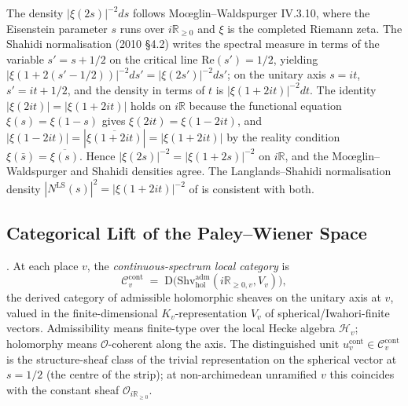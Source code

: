 \begin{remark}
\label{v4-arith:w6-d:rem:plancherel-density}
The density \(|\xi(2s)|^{-2}ds\) follows Mo{\oe}glin--Waldspurger IV.3.10,
where the Eisenstein parameter \(s\) runs over \(i\mathbb{R}_{\geq 0}\)
and \(\xi\) is the completed Riemann zeta. The Shahidi normalisation
(2010 \S 4.2) writes the spectral measure in terms of the variable
\(s' = s + 1/2\) on the critical line \(\mathrm{Re}(s')=1/2\),
yielding \(|\xi(1+2(s'-1/2))|^{-2}ds' = |\xi(2s')|^{-2}ds'\);
on the unitary axis \(s = it\), \(s' = it + 1/2\), and the density
in terms of \(t\) is \(|\xi(1+2it)|^{-2}dt\). The identity
\(|\xi(2it)| = |\xi(1+2it)|\) holds on \(i\mathbb{R}\) because
the functional equation \(\xi(s)=\xi(1-s)\) gives
\(\xi(2it) = \xi(1-2it)\), and
\(|\xi(1-2it)| = |\overline{\xi(1+2it)}| = |\xi(1+2it)|\)
by the reality condition \(\xi(\bar s) = \overline{\xi(s)}\).
Hence \(|\xi(2s)|^{-2} = |\xi(1+2s)|^{-2}\) on \(i\mathbb{R}\),
and the Mo{\oe}glin--Waldspurger and Shahidi densities agree.
The Langlands--Shahidi normalisation density \(|N^{\mathrm{LS}}(s)|^{2} = |\xi(1+2it)|^{-2}\)
of  is consistent with both.
\end{remark}

\subsection{Categorical Lift of the Paley--Wiener Space}

\begin{definition}
\label{v4-arith:w6-d:def:C-cont-local}
\ClaimStatusDefinitional. At each place \(v\), the
\emph{continuous-spectrum local category} is
\begin{equation}
\label{v4-arith:w6-d:eq:C-cont-local}
\mathcal{C}^{\mathrm{cont}}_{v}\;=\;\mathrm{D}\bigl(\mathrm{Shv}^{\mathrm{adm}}_{\mathrm{hol}}(i\mathbb{R}_{\geq 0,v},V_{v})\bigr),
\end{equation}
the derived category of admissible holomorphic sheaves on the
unitary axis at \(v\), valued in the finite-dimensional
\(K_{v}\)-representation \(V_{v}\) of spherical/Iwahori-finite
vectors. Admissibility means finite-type over the local Hecke
algebra \(\mathcal{H}_{v}\); holomorphy means \(\mathcal{O}\)-coherent
along the axis. The distinguished unit
\(u^{\mathrm{cont}}_{v}\in\mathcal{C}^{\mathrm{cont}}_{v}\) is the
structure-sheaf class of the trivial representation on the
spherical vector at \(s=1/2\) (the centre of the strip); at
non-archimedean unramified \(v\) this coincides with the constant
sheaf \(\mathcal{O}_{i\mathbb{R}_{\geq 0}}\).
\end{definition}

